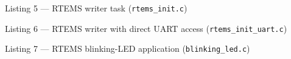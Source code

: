\documentclass[
	a4paper,
]{CSMakotoTechnicalReport}
\begin{document}
\label{lst:5}
\begin{appendixcode}{Listing 5 --- RTEMS writer task (\texttt{rtems\_init.c})}

\end{appendixcode}

\label{lst:6}
\begin{appendixcode}{Listing 6 --- RTEMS writer with direct UART access (\texttt{rtems\_init\_uart.c})}

\end{appendixcode}

\label{lst:7}
\begin{appendixcode}{Listing 7 --- RTEMS blinking-LED application (\texttt{blinking\_led.c})}

\end{appendixcode}


\printbibliography[title={References}]

\end{document}
